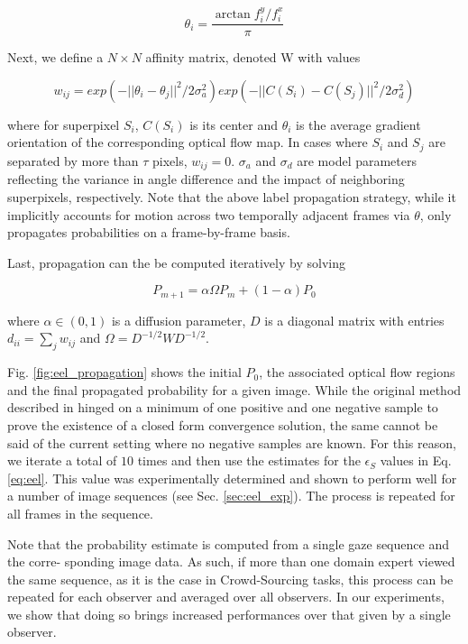\begin{equation}
\theta_{i} = \frac{\arctan{f_{i}^{y}} / f_{i}^{x}}{\pi}
\end{equation}

Next, we define a $N \times N$ affinity matrix, denoted W with values

\begin{equation}
w_{ij} = exp(-||\theta_{i} - \theta_{j}||^2 / 2\sigma_{a}^{2}) exp(-||C(S_i) - C(S_j)||^2 / 2\sigma_{d}^{2})
\end{equation}

where for superpixel $S_{i}$, $C(S_{i})$ is its center and $\theta_{i}$ is the average gradient orientation of
the corresponding optical flow map.
In cases where $S_{i}$ and $S_{j}$ are separated by more than $\tau$ pixels, $w_{ij}=0$.
$\sigma_{a}$ and $\sigma_{d}$ are model parameters reflecting the variance in angle difference and the impact of neighboring superpixels, respectively.
Note that the above label propagation strategy, while it implicitly accounts for motion
across two temporally adjacent frames
via $\theta$, only propagates probabilities on a frame-by-frame basis.

Last, propagation can the be computed iteratively by solving

\begin{equation}
P_{m+1} = \alpha \Omega P_{m} + (1 - \alpha)P_{0}
\end{equation}

where $\alpha \in (0,1)$ is a diffusion parameter, $D$ is a diagonal matrix with entries $d_{ii}=\sum_{j}w_{ij}$ and $\Omega = D^{-1/2} W D^{-1/2}$.

Fig. \ref{fig:eel_propagation} shows the initial $P_{0}$, the associated optical flow regions and the final propagated probability for a given image.
While the original method described in \cite{zhou04} hinged on a minimum of one positive and one negative sample to prove the existence of a closed form convergence solution, the same cannot be said of the current setting where no negative samples are known.
For this reason, we iterate a total of $10$ times and then use the estimates for the $\epsilon_{S}$
values in Eq. \ref{eq:eel}.
This value was experimentally determined and shown to perform well for a
number of image sequences (see Sec. \ref{sec:eel_exp}).
The process is repeated for all frames in the sequence.

Note that the probability estimate is computed from a single gaze sequence and the corre-
sponding image data. As such, if more than one domain expert viewed the same sequence, as it
is the case in Crowd-Sourcing tasks, this process can be repeated for each observer and averaged
over all observers.
In our experiments, we show that doing so brings increased performances over that given by a single observer.

